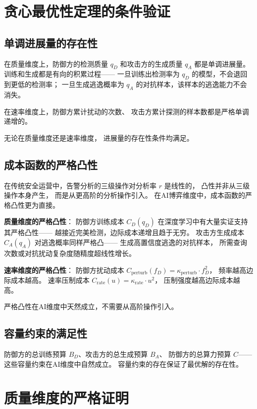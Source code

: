 \documentclass[11pt,a4paper]{article}
\begin{document}
\section{贪心最优性定理的条件验证}

\subsection{单调进展量的存在性}

在质量维度上，防御方的检测质量 \(q_D\) 和攻击方的生成质量 \(q_A\)
都是单调进展量。
训练和生成都是有向的积累过程——
一旦训练出检测率为 \(q_D\) 的模型，不会退回到更低的检测率；
一旦生成逃逸概率为 \(q_A\) 的对抗样本，该样本的逃逸能力不会消失。

在速率维度上，防御方累计扰动的次数、
攻击方累计探测的样本数都是严格单调递增的。

无论在质量维度还是速率维度，
进展量的存在性条件均满足。

\subsection{成本函数的严格凸性}

在传统安全运营中，告警分析的三级操作对分析率 \(r\) 是线性的，
凸性并非从三级操作本身产生，
而是从更高阶的分析操作引入。
在AI博弈维度中，成本函数的严格凸性更为直接。

\textbf{质量维度的严格凸性}：
防御方训练成本 \(C_D(q_D)\) 在深度学习中有大量实证支持其严格凸性——
越接近完美检测，边际成本递增且趋于无穷。
攻击方生成成本 \(C_A(q_A)\) 对逃逸概率同样严格凸——
生成高置信度逃逸的对抗样本，
所需查询次数或对抗扰动复杂度随精度超线性增长。

\textbf{速率维度的严格凸性}：
防御方扰动成本 \(C_{\text{perturb}}(f_D) = \kappa_{\text{perturb}} \cdot f_D^2\)，
频率越高边际成本越高。
速率压制成本 \(C_{\text{rate}}(u) = \kappa_{\text{rate}} \cdot u^2\)，
压制强度越高边际成本越高。

严格凸性在AI维度中天然成立，不需要从高阶操作引入。

\subsection{容量约束的满足性}

防御方的总训练预算 \(B_D\)、攻击方的总生成预算 \(B_A\)、
防御方的总算力预算 \(C\)——
这些容量约束在AI维度中自然成立。
容量约束的存在保证了最优解的存在性。

\section{质量维度的严格证明}
\end{document}
